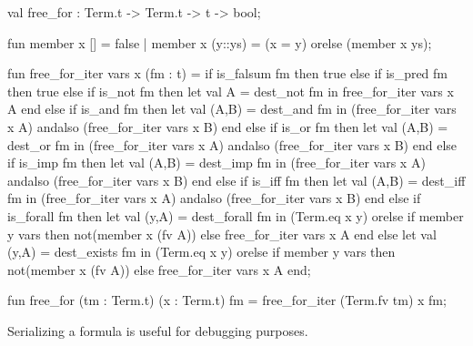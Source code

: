 \nwenddocs{}\plusendmoddef\nwstartdeflinemarkup{}\nwenddeflinemarkup
val free_for : Term.t -> Term.t -> t -> bool;
\nwendcode{}\nwdocspar

\nwenddocs{}\endmoddef\nwstartdeflinemarkup{}\nwenddeflinemarkup
fun member x [] = false
  | member x (y::ys) = (x = y) orelse (member x ys);

fun free_for_iter vars x (fm : t) =
  if is_falsum fm then true
  else if is_pred fm then true
  else if is_not fm
  then let val A = dest_not fm
       in free_for_iter vars x A end
  else if is_and fm
  then let val (A,B) = dest_and fm
       in (free_for_iter vars x A) andalso (free_for_iter vars x B) end
  else if is_or fm
  then let val (A,B) = dest_or fm
       in (free_for_iter vars x A) andalso (free_for_iter vars x B) end
  else if is_imp fm
  then let val (A,B) = dest_imp fm
       in (free_for_iter vars x A) andalso (free_for_iter vars x B) end
  else if is_iff fm
  then let val (A,B) = dest_iff fm
       in (free_for_iter vars x A) andalso (free_for_iter vars x B) end
  else if is_forall fm
  then let val (y,A) = dest_forall fm
       in (Term.eq x y) orelse
          if member y vars
          then not(member x (fv A))
          else free_for_iter vars x A
       end
  else let val (y,A) = dest_exists fm
       in (Term.eq x y) orelse
          if member y vars
          then not(member x (fv A))
          else free_for_iter vars x A
       end;

fun free_for (tm : Term.t) (x : Term.t) fm =
  free_for_iter (Term.fv tm) x fm;
\eatline
{}\nwendcode{}\nwdocspar
\begin{node}
Serializing a formula is useful for debugging purposes.
\end{node}

